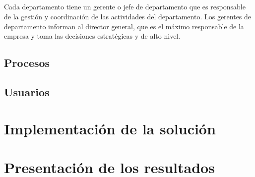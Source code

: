 \documentclass{report}
\begin{document}
          \paragraph*{}
          {
            Cada departamento tiene un gerente o jefe de departamento que es responsable de la gestión y coordinación de las actividades del departamento. Los gerentes de departamento informan al director general, que es el máximo responsable de la empresa y toma las decisiones estratégicas y de alto nivel.
            
          }
        \section{Procesos}
        \section{Usuarios}
    \chapter{Implementación de la solución}
    \chapter{Presentación de los resultados}
    
    
\end{document}
